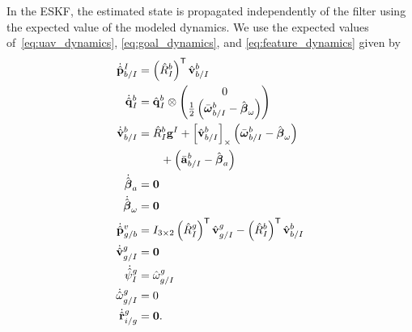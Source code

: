In the ESKF, the estimated state is propagated independently of the filter using
the expected value of the modeled dynamics. We use the expected values
of~\eqref{eq:uav_dynamics}, \eqref{eq:goal_dynamics}, and
\eqref{eq:feature_dynamics} given by
\begin{align}
  \dot{\hat{\vect{p}}}_{b/I}^I
  &=
  \left( \hat{R}_I^b \right)^\transpose \hat{\vect{v}}_{b/I}^b
  \label{eq:estimated_dynamics}
  \\
  \dot{\hat{\vect{q}}}_{I}^{b} 
  &= 	
  \hat{\q}_I^b \otimes \begin{pmatrix} 0 \\ \frac{1}{2}
  \left( \bar{\vect{\omega}}_{b/I}^b - \hat{\vect{\beta}}_\omega \right)
\end{pmatrix} \nonumber \\
  \dot{\hat{\vect{v}}}_{b/I}^b 
  &=
  \hat{R}_I^b \vect{g}^I
  +
  \skewmat{\hat{\vect{v}}_{b/I}^b}
  \left( \bar{\vect{\omega}}_{b/I}^b - \hat{\vect{\beta}}_\omega \right)
  \nonumber \\
  & \qquad +
  \left( \bar{\vect{a}}_{b/I}^b - \hat{\vect{\beta}}_a \right) \nonumber
  \\
  \dot{\hat{\vect{\beta}}}_a &= \vect{0} \nonumber
  \\
  \dot{\hat{\vect{\beta}}}_\omega &= \vect{0} \nonumber
  \\
  \dot{\hat{\vect{p}}}_{g/b}^{v} &= I_{3 \times 2} \left( \hat{R}_{I}^{g} \right)^\transpose
   \hat{\vect{v}}_{g/I}^{g} - \left( \hat{R}_{I}^{b} \right)^\transpose
  \hat{\vect{v}}_{b/I}^{b} \nonumber \\
  \dot{\hat{\vect{v}}}_{g/I}^{g} &= \vect{0} \nonumber \\
  \dot{\hat{\psi}}_{I}^{g} &= \hat{\omega}_{g/I}^g \nonumber \\
  \dot{\hat{\omega}}_{g/I}^{g} &= 0 \nonumber \\
  \dot{\hat{\vect{r}}}_{i/g}^g &= \vect{0}. \nonumber
\end{align}

